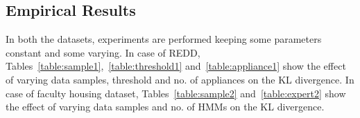 \documentclass{sig-alternate}
\begin{document}


\subsection{Empirical Results}
In both the datasets, experiments are performed keeping some parameters constant and some varying. In case of REDD, Tables~\ref{table:sample1},~\ref{table:threshold1} and~\ref{table:appliance1} show the effect of varying data samples, threshold and no. of appliances on the KL divergence.
In case of faculty housing dataset, Tables~\ref{table:sample2} and~\ref{table:expert2} show the effect of varying data samples and no. of HMMs on the KL divergence.


\end{document}
